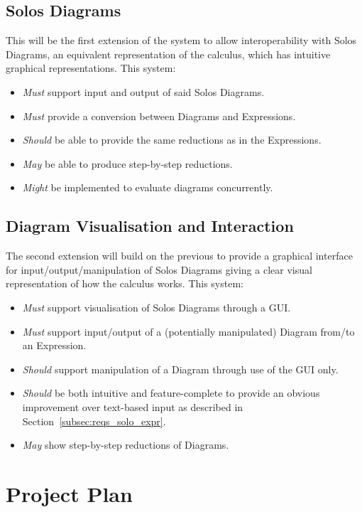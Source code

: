 \documentclass{article}
\begin{document}
\subsection{Solos Diagrams}
This will be the first extension of the system to allow interoperability with Solos Diagrams, an equivalent representation of the calculus, which has intuitive graphical representations.
This system:
\begin{itemize}
	\item \textit{Must} support input and output of said Solos Diagrams.
	\item \textit{Must} provide a conversion between Diagrams and Expressions.
	\item \textit{Should} be able to provide the same reductions as in the Expressions.
	\item \textit{May} be able to produce step-by-step reductions.
	\item \textit{Might} be implemented to evaluate diagrams concurrently.
\end{itemize}

\subsection{Diagram Visualisation and Interaction}
The second extension will build on the previous to provide a graphical interface for input/output/manipulation of Solos Diagrams giving a clear visual representation of how the calculus works.
This system:
\begin{itemize}
	\item \textit{Must} support visualisation of Solos Diagrams through a GUI\@.
	\item \textit{Must} support input/output of a (potentially manipulated) Diagram from/to an Expression.
	\item \textit{Should} support manipulation of a Diagram through use of the GUI only.
	\item \textit{Should} be both intuitive and feature-complete to provide an obvious improvement over text-based input as described in Section~\ref{subsec:reqs_solo_expr}.
	\item \textit{May} show step-by-step reductions of Diagrams.
\end{itemize}


\section{Project Plan}
\end{document}
